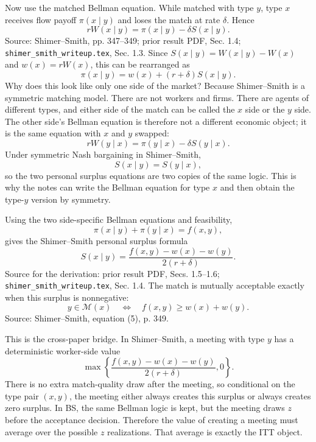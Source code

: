﻿\documentclass[11pt]{article}
\newcommand{\1}{\mathbf{1}}
\begin{document}
Now use the matched Bellman equation. While matched with type $y$, type $x$
receives flow payoff $\pi(x\mid y)$ and loses the match at rate $\delta$. Hence
\[
rW(x\mid y)
=
\pi(x\mid y)-\delta S(x\mid y).
\tag{SS-matched}
\]
Source: Shimer--Smith, pp. 347--349; prior result PDF, Sec. 1.4;
\texttt{shimer\_smith\_writeup.tex}, Sec. 1.3. Since
$S(x\mid y)=W(x\mid y)-W(x)$ and $w(x)=rW(x)$, this can be rearranged as
\[
\pi(x\mid y)
=
w(x)+(r+\delta)S(x\mid y).
\]
Why does this look like only one side of the market? Because Shimer--Smith is a
symmetric matching model. There are not workers and firms. There are agents of
different types, and either side of the match can be called the $x$ side or the
$y$ side. The other side's Bellman equation is therefore not a different economic
object; it is the same equation with $x$ and $y$ swapped:
\[
rW(y\mid x)
=
\pi(y\mid x)-\delta S(y\mid x).
\tag{SS-matched-y}
\]
Under symmetric Nash bargaining in Shimer--Smith,
\[
S(x\mid y)=S(y\mid x),
\]
so the two personal surplus equations are two copies of the same logic. This is
why the notes can write the Bellman equation for type $x$ and then obtain the
type-$y$ version by symmetry.

Using the two side-specific Bellman equations and feasibility,
\[
\pi(x\mid y)+\pi(y\mid x)=f(x,y),
\]
gives the Shimer--Smith personal surplus formula
\[
S(x\mid y)
=
\frac{f(x,y)-w(x)-w(y)}{2(r+\delta)}.
\tag{SS-surplus}
\]
Source for the derivation: prior result PDF, Secs. 1.5--1.6;
\texttt{shimer\_smith\_writeup.tex}, Sec. 1.4. The match is mutually acceptable
exactly when this surplus is nonnegative:
\[
y\in\mathcal M(x)
\quad\Longleftrightarrow\quad
f(x,y)\geq w(x)+w(y).
\tag{SS-threshold}
\]
Source: Shimer--Smith, equation (5), p. 349.

This is the cross-paper bridge. In Shimer--Smith, a meeting with type $y$ has a
deterministic worker-side value
\[
\max\left\{
\frac{f(x,y)-w(x)-w(y)}{2(r+\delta)},0
\right\}.
\]
There is no extra match-quality draw after the meeting, so conditional on the
type pair $(x,y)$, the meeting either always creates this surplus or always
creates zero surplus. In BS, the same Bellman logic is kept, but the meeting
draws $z$ before the acceptance decision. Therefore the value of creating a
meeting must average over the possible $z$ realizations. That average is exactly
the ITT object.
\end{document}
